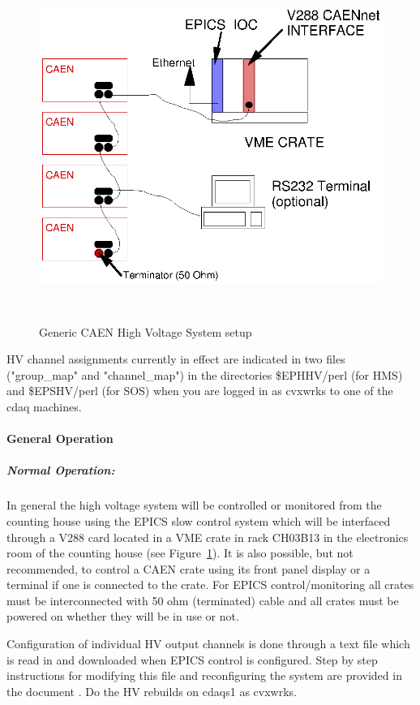 \begin{figure}
\includegraphics[height=4.5in]{CAENHV.ps}
\caption{Generic CAEN High Voltage System setup\label{fig:caen_setup}}
\end{figure}

HV channel assignments currently in effect are indicated in 
two files ("group\_map" and
"channel\_map") in the directories \$EPHHV/perl (for HMS) and \$EPSHV/perl (for
SOS) when you are logged in as cvxwrks to one of the cdaq machines.

\paragraph{General Operation}

\subparagraph{Normal Operation:}

In general the high voltage system will be controlled or monitored
from the counting house using the EPICS slow control system which will
be interfaced through a V288 card located in a VME crate in rack CH03B13
in the electronics room of the counting house
(see Figure~\ref{fig:caen_setup}).  It is also possible, but not recommended,
to control a CAEN crate using its front panel display or a terminal
if one is connected to the crate.
For EPICS control/monitoring all crates must be interconnected with 50
ohm (terminated) cable and all crates must be powered on whether they
will be in use or not.

Configuration of individual HV output channels is done through a
text file which is read in and downloaded when EPICS control is
configured. Step by step instructions for modifying this file and
reconfiguring the system are provided in the document
. Do the HV rebuilds on cdaqs1 as cvxwrks.


